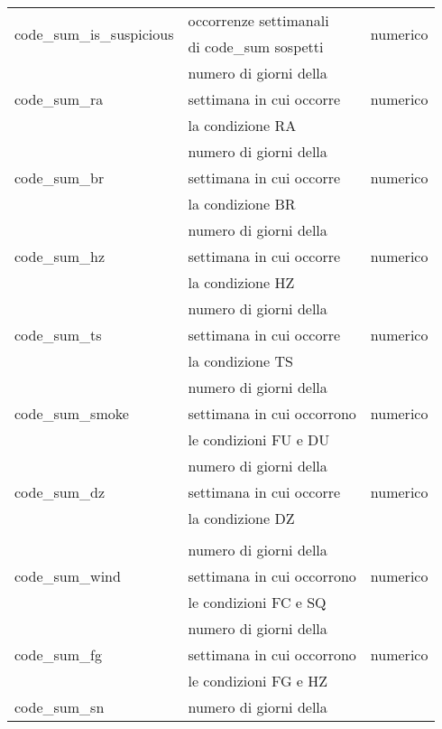 \begin{longtable}{lll}
	\multirow{2}{*}{code\_sum\_is\_suspicious}	& occorrenze settimanali & 
	\multirow{2}{*}{numerico}	\\
	& di code\_sum sospetti & 	 \\\hline	
	\multirow{3}{*}{code\_sum\_ra}	& numero di giorni della 	& 	 
	\multirow{3}{*}{numerico} \\
	& settimana in cui occorre & \\ 
	& la condizione RA & \\ \hline
	\multirow{3}{*}{code\_sum\_br}	& numero di giorni della	 & 	 
	\multirow{3}{*}{numerico} \\
	& settimana in cui occorre & \\ 
	& la condizione BR & \\ \hline	
	\multirow{3}{*}{code\_sum\_hz}	& numero di giorni della	 &  	 
	\multirow{3}{*}{numerico} \\
	& settimana in cui occorre & \\ 	 
	& la condizione HZ & \\ \hline
	\multirow{3}{*}{code\_sum\_ts}	& numero di giorni della	 & 	 
	\multirow{3}{*}{numerico} \\
	& settimana in cui occorre & \\  	 
	& la condizione TS & \\ \hline
	\multirow{3}{*}{code\_sum\_smoke}	& numero di giorni della & 	 
	\multirow{3}{*}{numerico} \\
	& settimana in cui occorrono & \\ 
	& le condizioni FU e DU & \\ \hline
	\multirow{3}{*}{code\_sum\_dz}	& numero di giorni della	 & 		
	\multirow{3}{*}{numerico} \\
	& settimana in cui occorre & \\ 	 
	& la condizione DZ & \\ \hline
	\\\hline
	\multirow{3}{*}{code\_sum\_wind}	& numero di giorni della &	 	 
	\multirow{3}{*}{numerico} \\
	& settimana in cui occorrono & \\ 
	& le condizioni FC e SQ & \\ \hline
	\multirow{3}{*}{code\_sum\_fg}	& numero di giorni della	 &		
	\multirow{3}{*}{numerico} \\
	& settimana in cui occorrono & \\  	 
	& le condizioni FG e HZ & \\ \hline
	\multirow{3}{*}{code\_sum\_sn}	& numero di giorni della	 & 		

\end{longtable}
